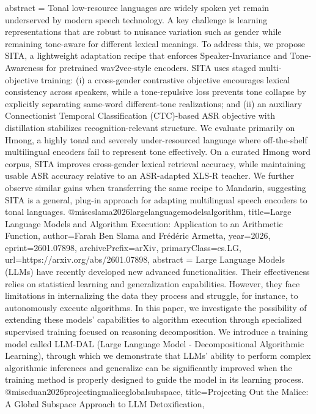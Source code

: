{      abstract = {Tonal low-resource languages are widely spoken yet remain underserved by modern speech technology. A key challenge is learning representations that are robust to nuisance variation such as gender while remaining tone-aware for different lexical meanings. To address this, we propose SITA, a lightweight adaptation recipe that enforces Speaker-Invariance and Tone-Awareness for pretrained wav2vec-style encoders. SITA uses staged multi-objective training: (i) a cross-gender contrastive objective encourages lexical consistency across speakers, while a tone-repulsive loss prevents tone collapse by explicitly separating same-word different-tone realizations; and (ii) an auxiliary Connectionist Temporal Classification (CTC)-based ASR objective with distillation stabilizes recognition-relevant structure. We evaluate primarily on Hmong, a highly tonal and severely under-resourced language where off-the-shelf multilingual encoders fail to represent tone effectively. On a curated Hmong word corpus, SITA improves cross-gender lexical retrieval accuracy, while maintaining usable ASR accuracy relative to an ASR-adapted XLS-R teacher. We further observe similar gains when transferring the same recipe to Mandarin, suggesting SITA is a general, plug-in approach for adapting multilingual speech encoders to tonal languages.}
}@misc{slama2026largelanguagemodelsalgorithm,
      title={Large Language Models and Algorithm Execution: Application to an Arithmetic Function}, 
      author={Farah Ben Slama and Frédéric Armetta},
      year={2026},
      eprint={2601.07898},
      archivePrefix={arXiv},
      primaryClass={cs.LG},
      url={https://arxiv.org/abs/2601.07898},
      abstract = {Large Language Models (LLMs) have recently developed new advanced functionalities. Their effectiveness relies on statistical learning and generalization capabilities. However, they face limitations in internalizing the data they process and struggle, for instance, to autonomously execute algorithms. In this paper, we investigate the possibility of extending these models' capabilities to algorithm execution through specialized supervised training focused on reasoning decomposition. We introduce a training model called LLM-DAL (Large Language Model - Decompositional Algorithmic Learning), through which we demonstrate that LLMs' ability to perform complex algorithmic inferences and generalize can be significantly improved when the training method is properly designed to guide the model in its learning process.}
}@misc{duan2026projectingmaliceglobalsubspace,
      title={Projecting Out the Malice: A Global Subspace Approach to LLM Detoxification}, 
}
